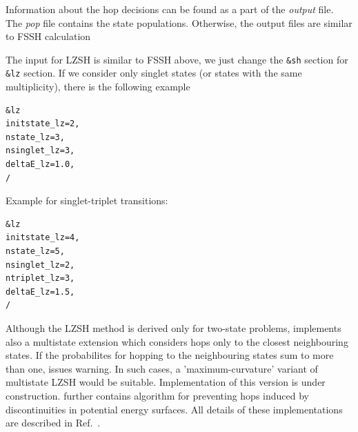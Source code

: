 Information about the hop decisions can be found as a part of the \textit{output} file. The \textit{pop} file contains the state populations. Otherwise, the output files are similar to FSSH calculation

The input for LZSH is similar to FSSH above, we just change the \verb|&sh| section for \verb|&lz| section. If we consider only singlet states (or states with the same multiplicity), there is the following example
\begin{verbatim}
&lz
initstate_lz=2,				 
nstate_lz=3,
nsinglet_lz=3,
deltaE_lz=1.0,
/
\end{verbatim}
Example for singlet-triplet transitions:
\begin{verbatim}
&lz
initstate_lz=4,
nstate_lz=5,
nsinglet_lz=2,
ntriplet_lz=3,
deltaE_lz=1.5,
/
\end{verbatim}

Although the LZSH method is derived only for two-state problems, \abin implements also a multistate extension which considers hops only to the closest neighbouring states. If the probabilites for hopping to the neighbouring states sum to more than one, \abin issues warning. In such cases, a 'maximum-curvature' variant of multistate LZSH would be suitable.\cite{Jira2025} Implementation of this version is under construction. \abin further contains algorithm for preventing hops induced by discontinuities in potential energy surfaces. All details of these implementations are described in Ref.~.










